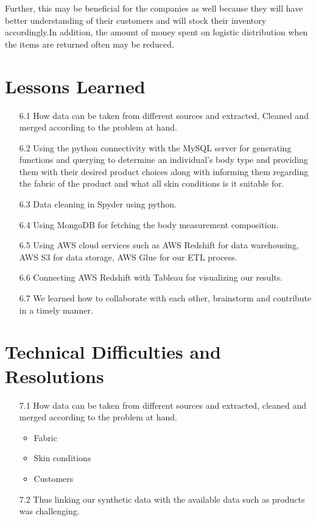 \documentclass[11pt,journal,compsoc]{IEEEtran}
\begin{document}
Further, this may be beneficial for the companies as well because they will have better understanding of their customers and will stock their inventory accordingly.In addition, the amount of money spent on logistic distribution when the items are returned often may be reduced. 

\section{Lessons Learned}
\begin{itemize}
    \item[6.1] How data can be taken from different sources and extracted, Cleaned and merged according to the problem at hand.
    \item[6.2] Using the python connectivity with the MySQL server for generating functions and querying to determine an individual's body type and providing them with their desired product choices along with informing them regarding the fabric of the product and what all skin conditions is it suitable for.
    \item[6.3] Data cleaning in Spyder using python. 
    \item[6.4] Using MongoDB for fetching the body measurement composition. 
    \item[6.5] Using AWS cloud services such as AWS Redshift for data warehousing, AWS S3 for data storage, AWS Glue for our ETL process. 
    \item[6.6] Connecting AWS Redshift with Tableau for visualizing our results. 
    \item[6.7] We learned how to collaborate with each other, brainstorm and contribute in a timely manner. 
\end{itemize}

\section{Technical Difficulties and Resolutions}
\begin{itemize}
    \item[7.1] How data can be taken from different sources and extracted, cleaned and merged according to the problem at hand.
    \begin{itemize}
        \item Fabric 
        \item Skin conditions
        \item Customers
    \end{itemize}
    \item[7.2] Thus linking our synthetic data with the available data such as products was challenging.
\end{itemize}
\end{document}
